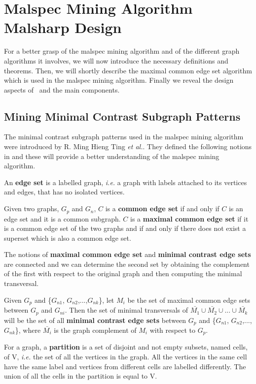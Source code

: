 \chapter{Malspec Mining Algorithm Malsharp Design}
\label{chapter:third}

For a better grasp of the malspec mining algorithm and of the different graph algorithms it involves, we will now introduce the necessary definitions and theorems. Then, we will shortly describe the maximal common edge set algorithm which is used in the malspec mining algorithm. Finally we reveal the design aspects of \project\ and the main components.

\section{Mining Minimal Contrast Subgraph Patterns}
\label{third:graph-defs}

The minimal contrast subgraph patterns used in the malspec mining algorithm were introduced by R. Ming Hieng Ting \textit{et al.}. They defined the following notions in \cite{minimal-contrast-subgraph} and these will provide a better understanding of the malspec mining algorithm.

An \textbf{edge set} is a labelled graph, \textit{i.e.} a graph with labels attached to its vertices and edges, that has no isolated vertices.

Given two graphs, $G_{p}$ and $G_{n}$, $C$ is a \textbf{common edge set} if and only if $C$ is an edge set and it is a common subgraph. $C$ is a \textbf{maximal common edge set} if it is a common edge set of the two graphs and if and only if there does not exist a superset which is also a common edge set.

The notions of \textbf{maximal common edge set} and \textbf{minimal contrast edge sets} are connected and we can determine the second set by obtaining the complement of the first with respect to the original graph and then computing the minimal transversal.

Given $G_{p}$ and \{$G_{n1}$, $G_{n2}$,...,$G_{nk}$\}, let $M_{i}$ be the set of maximal common edge sets between $G_{p}$ and $G_{ni}$. Then the set of minimal transversals of $\bar{M_{1}} \cup \bar{M_{2}} \cup ... \cup \bar{M_{k}}$ will be the set of all \textbf{minimal contrast edge sets} between $G_{p}$ and \{$G_{n1}$, $G_{n2}$,...,$G_{nk}$\}, where $\bar{M_{i}}$ is the graph complement of $M_{i}$ with respect to $G_{p}$.

For a graph, a \textbf{partition} is a set of disjoint and not empty subsets, named cells, of V, \textit{i.e.} the set of all the vertices in the graph. All the vertices in the same cell have the same label and vertices from different cells are labelled differently. The union of all the cells in the partition is equal to V.

